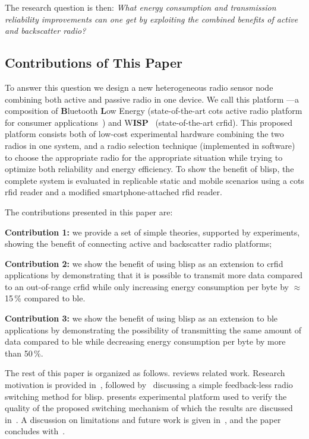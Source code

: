 \documentclass[conference,letterpaper,twoside,final,10pt]{IEEEtran}
\begin{document}
The research question is then:
\textit{What energy consumption and transmission reliability improvements can one get by exploiting the combined benefits of active and backscatter radio?}

\subsection{Contributions of This Paper}
\label{sec:introduction/contributions}

To answer this question we design a new heterogeneous radio sensor node combining both active and passive radio in one device.
We call this platform ---a composition of \textbf{B}luetooth \textbf{L}ow Energy (state-of-the-art \ac{cots} active radio platform for consumer applications~\cite{gomez2012sensors}) and W\textbf{ISP}~\cite{wiki2015wisp5} (state-of-the-art \ac{crfid}).
This proposed platform consists both of low-cost experimental hardware combining the two radios in one system, and a radio selection technique (implemented in software) to choose the appropriate radio for the appropriate situation while trying to optimize both reliability and energy efficiency.
To show the benefit of \ac{blisp}, the complete system is evaluated in replicable static and mobile scenarios using a \ac{cots} \ac{rfid} reader and a modified smartphone-attached \ac{rfid} reader.

The contributions presented in this paper are:

\textbf{Contribution 1:} we provide a set of simple theories, supported by experiments, showing the benefit of connecting active and backscatter radio platforms;

\textbf{Contribution 2:} we show the benefit of using \ac{blisp} as an extension to \ac{crfid} applications by demonstrating that it is possible to transmit more data compared to an out-of-range \ac{crfid} while only increasing energy consumption per byte by $\approx$15\,\% compared to \ac{ble}.

\textbf{Contribution 3:} we show the benefit of using \ac{blisp} as an extension to \ac{ble} applications by demonstrating the possibility of transmitting the same amount of data compared to \ac{ble} while decreasing energy consumption per byte by more than 50\,\%.

The rest of this paper is organized as follows.
 reviews related work.
Research motivation is provided in~, followed by~ discussing a simple feedback-less radio switching method for \ac{blisp}.
 presents experimental platform used to verify the quality of the proposed switching mechanism of which the results are discussed in~.
A discussion on limitations and future work is given in~, and the paper concludes with~.
\end{document}
